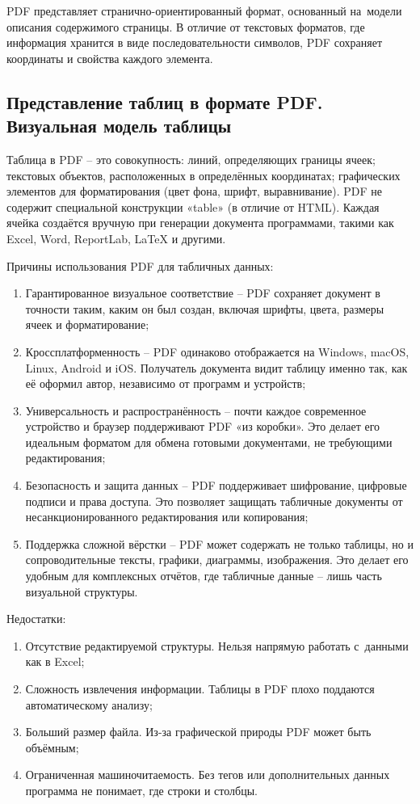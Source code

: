\documentclass{ou}
\begin{document}
PDF представляет странично-ориентированный формат, основанный на~модели описания содержимого страницы. В отличие от текстовых форматов, где информация хранится в виде последовательности символов, PDF сохраняет координаты и свойства каждого элемента.
\subsection{Представление таблиц в формате PDF. Визуальная модель таблицы} 
Таблица в PDF -- это совокупность: линий, определяющих границы ячеек; текстовых объектов, расположенных в определённых координатах; графических элементов для форматирования (цвет фона, шрифт, выравнивание). PDF не содержит специальной конструкции «table» (в отличие от HTML). Каждая ячейка создаётся вручную при генерации документа программами, такими как Excel, Word, ReportLab, LaTeX и другими.

Причины использования PDF для табличных данных:
\begin{enumerate}[leftmargin=0em, itemindent=3.75em, nosep, label=\arabic*)]
\item Гарантированное визуальное соответствие -- PDF сохраняет документ в точности таким, каким он был создан, включая шрифты, цвета, размеры ячеек и форматирование;
\item Кроссплатформенность -- PDF одинаково отображается на Windows, macOS, Linux, Android и iOS. Получатель документа видит таблицу именно так, как её оформил автор, независимо от программ и устройств;
\item Универсальность и распространённость -- почти каждое современное устройство и браузер поддерживают PDF «из коробки». Это делает его идеальным форматом для обмена готовыми документами, не требующими редактирования;
\item Безопасность и защита данных -- PDF поддерживает шифрование, цифровые подписи и права доступа. Это позволяет защищать табличные документы от несанкционированного редактирования или копирования;
\item Поддержка сложной вёрстки -- PDF может содержать не только таблицы, но и сопроводительные тексты, графики, диаграммы, изображения. Это делает его удобным для комплексных отчётов, где табличные данные -- лишь часть визуальной структуры.
\end{enumerate}

Недостатки:
\begin{enumerate}[leftmargin=0em, itemindent=3.75em, nosep, label=\arabic*)]
\item Отсутствие редактируемой структуры. Нельзя напрямую работать с~данными как в Excel;
\item Сложность извлечения информации. Таблицы в PDF плохо поддаются автоматическому анализу;
\item Больший размер файла. Из-за графической природы PDF может быть объёмным;
\item Ограниченная машиночитаемость. Без тегов или дополнительных данных программа не понимает, где строки и столбцы.
\end{enumerate}
\end{document}
